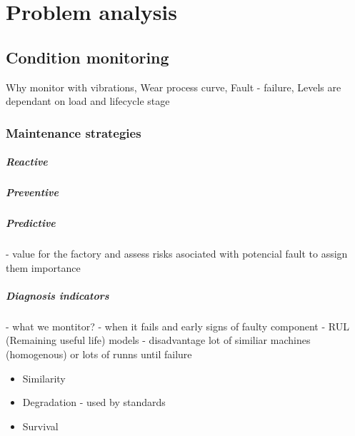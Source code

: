 \chapter{Problem analysis}


\section{Condition monitoring}
Why monitor with vibrations, Wear process curve, Fault - failure, Levels are dependant on load and lifecycle stage

\subsection{Maintenance strategies}
\paragraph{Reactive}
\paragraph{Preventive}
\paragraph{Predictive}
- value for the factory and assess risks asociated with potencial fault to assign them importance

\paragraph{Diagnosis indicators} - what we montitor? - when it fails and early signs of faulty component
- RUL (Remaining useful life) models - disadvantage lot of similiar machines (homogenous) or lots of runns until failure
\begin{itemize}
\item Similarity
\item Degradation - used by standards
\item Survival
\end{itemize}

